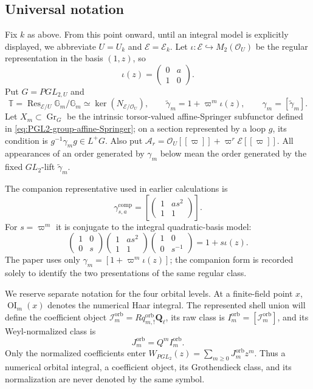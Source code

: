 \documentclass[11pt]{article}
\theoremstyle{definition}
\theoremstyle{remark}
\newcommand{\Qell}{\mathbf Q_\ell}
\newcommand{\Uk}{U_k}
\begin{document}
\subsection{Universal notation}

Fix $k$ as above.  From this point onward, until an integral model is
explicitly displayed, we abbreviate $U=\Uk$ and
$\mathcal E=\mathcal E_k$.  Let
$\iota:\mathcal E\hookrightarrow M_2(\mathcal O_U)$ be the regular
representation in the basis $(1,z)$, so
\[
 \iota(z)=\begin{pmatrix}0&a\\1&0\end{pmatrix}.
\]
Put $G=PGL_{2,U}$ and
\[
 \mathbb T=\operatorname{Res}_{\mathcal E/U}\mathbb G_m/\mathbb G_m
 \simeq\ker(N_{\mathcal E/\mathcal O_U}),\qquad
 \widetilde\gamma_m=1+\varpi^m\iota(z),\qquad
 \gamma_m=[\widetilde\gamma_m].
\]
Let $X_m\subset\operatorname{Gr}_G$ be the intrinsic torsor-valued
affine-Springer subfunctor defined in
\eqref{eq:PGL2-group-affine-Springer}; on a section represented by a loop
$g$, its condition is $g^{-1}\gamma_mg\in L^+G$.  Also put
$\mathcal A_r=\mathcal O_U[[\varpi]]+\varpi^r\mathcal E[[\varpi]]$.
All appearances of an order generated by $\gamma_m$ below mean the order
generated by the fixed $GL_2$-lift $\widetilde\gamma_m$.

The companion representative used in earlier calculations is
\[
 \gamma^{\mathrm{comp}}_{s,a}
 =\left[\begin{pmatrix}1&as^2\\1&1\end{pmatrix}\right].
\]
For $s=\varpi^m$ it is conjugate to the integral quadratic-basis model:
\begin{equation}
 \begin{pmatrix}1&0\\0&s\end{pmatrix}
 \begin{pmatrix}1&as^2\\1&1\end{pmatrix}
 \begin{pmatrix}1&0\\0&s^{-1}\end{pmatrix}
 =1+s\iota(z).
 \label{eq:companion-integral-conjugacy}
\end{equation}
The paper uses only $\gamma_m=[1+\varpi^m\iota(z)]$; the companion form is
recorded solely to identify the two presentations of the same regular class.

We reserve separate notation for the four orbital levels.  At a finite-field
point $x$, $\operatorname{OI}_m(x)$ denotes the numerical Haar integral.
The represented shell union will define the coefficient object
$\mathcal I_m^{\mathrm{orb}}=Rq^{\mathrm{orb}}_{m,!}\Qell$, its raw class is
$I_m^{\mathrm{orb}}=[\mathcal I_m^{\mathrm{orb}}]$, and its Weyl-normalized
class is
\[
 J_m^{\mathrm{orb}}=Q^mI_m^{\mathrm{orb}}.
\]
Only the normalized coefficients enter
$W_{PGL_2}(z)=\sum_{m\ge0}J_m^{\mathrm{orb}}z^m$.  Thus a numerical orbital
integral, a coefficient object, its Grothendieck class, and its normalization
are never denoted by the same symbol.
\end{document}
